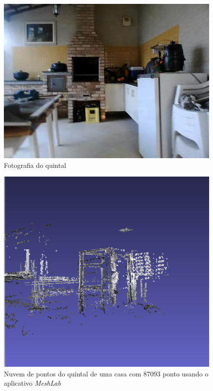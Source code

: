 \begin{figure}[H]
	\centering
		\includegraphics[width= \textwidth]{Imagens/figura4-12.jpg}
	\caption{Fotografia do quintal}
	\label{fig4:12}
\end{figure}

\begin{figure}[H]
	\centering
		\includegraphics[width= \textwidth]{Imagens/figura4-10.jpg}
	\caption{Nuvem de pontos do quintal de uma casa com 87093 ponto usando o aplicativo \textit{MeshLab}}
	\label{fig4:10}
\end{figure}


